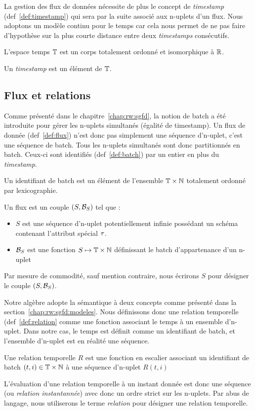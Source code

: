 La gestion des flux de données nécessite de plus le concept de \textit{timestamp} (def~\ref{def:timestamp}) qui sera par la suite associé aux n-uplets d'un flux. Nous adoptons un modèle continu pour le temps car cela nous permet de ne pas faire d'hypothèse sur la plus courte distance entre deux \textit{timestamps} consécutifs.
\begin{defi}[Timestamp]\label{def:timestamp}
    L'espace temps $\mathbb{T}$ est un corps totalement ordonné et isomorphique à $\mathbb{R}$. 

    Un \textit{timestamp} est un élément de $\mathbb{T}$.
\end{defi}

\subsection{Flux et relations}
Comme présenté dans le chapitre~\ref{chap:rw:sgfd}, la notion de batch a été introduite pour gérer les n-uplets simultanés (égalité de timestamp). Un flux de donnée (def~\ref{def:flux}) n'est donc pas simplement une séquence d'n-uplet, c'est une séquence de batch. Tous les n-uplets simultanés  sont donc partitionnés en batch. Ceux-ci sont identifiés (def~\ref{def:batch}) par un entier en plus du \textit{timestamp}.
\begin{defi}\label{def:batch}
    Un identifiant de batch est un élément de l'ensemble $\mathbb{T}\times\mathbb{N}$ totalement ordonné par lexicographie.
\end{defi}
\begin{defi}[Flux]\label{def:flux}
    Un flux est un couple $(S,\mathcal{B}_S)$ tel que :
    \begin{itemize}
        \item $S$ est une séquence d'n-uplet potentiellement infinie possédant un schéma contenant l'attribut spécial $\tau$.
        \item $\mathcal{B}_S$ est une fonction $S\mapsto \mathbb{T}\times\mathbb{N}$ définissant le batch d'appartenance d'un n-uplet
    \end{itemize}
    
    Par mesure de commodité, sauf mention contraire, nous écrirons $S$ pour désigner le couple $(S,\mathcal{B}_S)$.
\end{defi}

Notre algèbre adopte la sémantique à deux concepts comme présenté dans la section~\ref{chap:rw:sgfd:modeles}. Nous définissons donc une relation temporelle (def~\ref{def:relation} comme une fonction associant le temps à un ensemble d'n-uplet. Dans notre cas, le temps est définit comme un identifiant de batch, et l'ensemble d'n-uplet est en réalité une séquence. 
\begin{defi}\label{def:relation}
	Une relation temporelle $R$ est une fonction en escalier associant un identifiant de batch $(t,i)\in\mathbb{T}\times\mathbb{N}$ à une séquence d'n-uplet $R(t,i)$
\end{defi}
L'évaluation d'une relation temporelle à un instant donnée est donc une séquence (ou \textit{relation instantannée}) avec donc un ordre strict sur les n-uplets. Par abus de langage, nous utiliserons le terme \textit{relation} pour désigner une relation temporelle.

